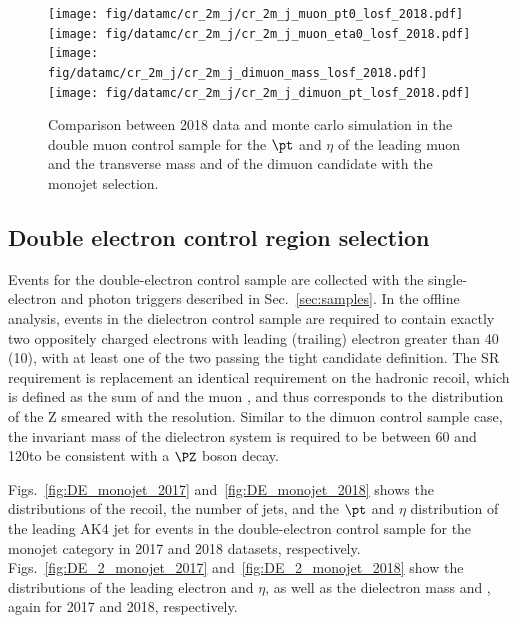 {\begin{figure}[htbp]
    \begin{center}
        \texttt{[image: fig/datamc/cr\_2m\_j/cr\_2m\_j\_muon\_pt0\_losf\_2018.pdf]}
        \texttt{[image: fig/datamc/cr\_2m\_j/cr\_2m\_j\_muon\_eta0\_losf\_2018.pdf]} \\
        \texttt{[image: fig/datamc/cr\_2m\_j/cr\_2m\_j\_dimuon\_mass\_losf\_2018.pdf]}
        \texttt{[image: fig/datamc/cr\_2m\_j/cr\_2m\_j\_dimuon\_pt\_losf\_2018.pdf]}
    \end{center}
    \caption{Comparison between 2018 data and monte carlo simulation in the double muon control sample for
    the $\pt$ and $\eta$ of the leading muon and the transverse mass and \pt of the dimuon candidate with the monojet selection.}
    \label{fig:DM_2_monojet_2018}
\end{figure}

\newpage

\subsection{Double electron control region selection}
\label{sec:selection_cr_2e}
Events for the double-electron control sample are collected with the single-electron and photon triggers described in Sec.~\ref{sec:samples}. In the offline analysis, events in the dielectron control sample are required to contain exactly two oppositely charged electrons with leading (trailing) electron \pt greater than 40 (10)\GeV, with at least one of the two passing the tight candidate definition. The SR \ptmiss requirement is replacement an identical requirement on the hadronic recoil, which is defined as the sum of \ptvecmiss and the muon \vpt, and thus corresponds to the distribution of the Z \pt smeared with the \ptmiss resolution. Similar to the dimuon control sample case, the invariant mass of the dielectron system is required to be between 60 and 120\GeV to be consistent with a $\PZ$ boson decay.

Figs.~\ref{fig:DE_monojet_2017} and~\ref{fig:DE_monojet_2018} shows the distributions of the recoil, the number of jets, and the $\pt$ and $\eta$ distribution of the leading AK4  jet
for events in the double-electron control sample for the monojet category in 2017 and 2018 datasets, respectively. Figs.~\ref{fig:DE_2_monojet_2017} and~\ref{fig:DE_2_monojet_2018} show the distributions of the leading electron \pt and $\eta$, as well as the dielectron mass and \pt, again for 2017 and 2018, respectively.

}
